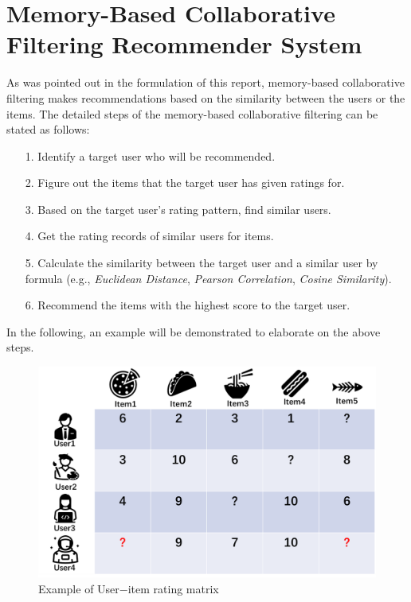 \section{Memory-Based Collaborative Filtering Recommender System}
As was pointed out in the formulation of this report, memory-based collaborative filtering makes recommendations based on the similarity between the users or the items. The detailed steps of the memory-based collaborative filtering can be stated as follows:
\begin{itemize}
    \item[1. ]Identify a target user who will be recommended.
    \item[2. ]Figure out the items that the target user has given ratings for.
    \item[3. ]Based on the target user’s rating pattern, find similar users.
    \item[4. ]Get the rating records of similar users for items.
    \item[5. ]Calculate the similarity between the target user and a similar user by formula (e.g., \textit {Euclidean Distance}, \textit{Pearson Correlation}, \textit{Cosine Similarity}).
    \item[6. ]Recommend the items with the highest score to the target user.

\end{itemize}
In the following, an example will be demonstrated to elaborate on the above steps.
\begin{figure}[htbp]
\centering
\includegraphics[scale=0.55]{figure/rating1.png}
\caption{Example of User$-$item rating matrix}
\end{figure}

